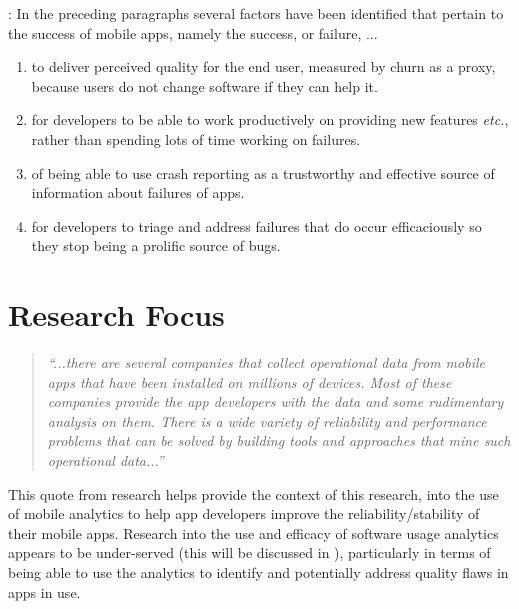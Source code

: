 \medskip
{}: %
In the preceding paragraphs several factors have been identified that pertain to the success of mobile apps, namely the success, or failure, ...
\begin{enumerate}
    \item to deliver perceived quality for the end user, measured by churn as a proxy, because users do not change software if they can help it. %
    \item for developers to be able to work productively on providing new features \emph{etc.}, rather than spending lots of time working on failures.
    \item of being able to use crash reporting as a trustworthy and effective source of information about failures of apps.
    \item for developers to triage and address failures that do occur efficaciously so they stop being a prolific source of bugs.
\end{enumerate}

\section{Research Focus}
\begin{quote}
    \emph{``...there are several companies that collect operational data from mobile apps that have been installed on millions of devices. Most of these companies provide the app developers with the data and some rudimentary analysis on them. There is a wide variety of reliability and performance problems that can be solved by building tools and approaches that mine such operational data...''}~ 
\end{quote} 

This quote from research helps provide the context of this research, into the use of mobile analytics to help app developers improve the reliability/stability of their mobile apps.
%
Research into the use and efficacy of software usage analytics appears to be under-served (this will be discussed in ), particularly in terms of being able to use the analytics to identify and potentially address quality flaws in apps in use.

